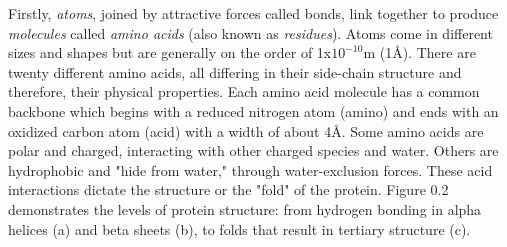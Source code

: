 \documentclass[12pt]{ucsddissertation}
\begin{document}
\begin{dissertationintroduction}

Firstly, \textit{atoms}, joined by attractive forces called bonds, link together to produce \textit{molecules} called \textit{amino acids} (also known as \textit{residues}). Atoms come in different sizes and shapes but are generally on the order of 1x$10^{-10}$m (1\si{\angstrom}). There are twenty different amino acids, all differing in their side-chain structure and therefore, their physical properties. Each amino acid molecule has a common backbone which begins with a reduced nitrogen atom (amino) and ends with an oxidized carbon atom (acid) with a width of about 4\si{\angstrom}. Some amino acids are polar and charged, interacting with other charged species and water. Others are hydrophobic and "hide from water," through water-exclusion forces. These acid interactions dictate the structure or the "fold" of the protein. Figure 0.2 demonstrates the levels of protein structure: from hydrogen bonding in alpha helices (a) and beta sheets (b), to folds that result in tertiary structure (c).




\end{dissertationintroduction}
\end{document}
